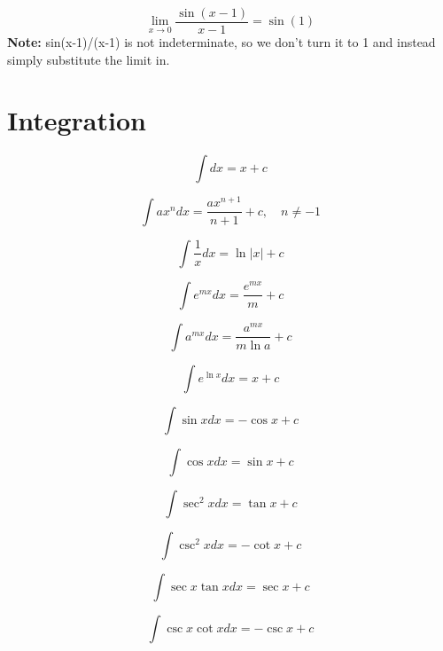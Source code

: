 \documentclass{article}
\begin{document}
\begin{equation}
\lim_{x \to 0} \frac{\sin(x-1)}{x-1} = \sin(1)
\end{equation}
\textbf{Note:} sin(x-1)/(x-1) is not indeterminate, so we don't turn it to 1 and instead simply substitute the limit in.

\section{Integration}

\begin{equation}
\int dx = x + c
\end{equation}

\begin{equation}
\int ax^n dx = \frac{a x^{n+1}}{n+1} + c, \quad n \neq -1
\end{equation}

\begin{equation}
\int \frac{1}{x} dx = \ln|x| + c
\end{equation}

\begin{equation}
\int e^{mx} dx = \frac{e^{mx}}{m} + c
\end{equation}

\begin{equation}
\int a^{mx} dx = \frac{a^{mx}}{m \ln a} + c
\end{equation}

\begin{equation}
\int e^{\ln x} dx = x + c
\end{equation}

\begin{equation}
\int \sin x dx = -\cos x + c
\end{equation}

\begin{equation}
\int \cos x dx = \sin x + c
\end{equation}

\begin{equation}
\int \sec^2 x dx = \tan x + c
\end{equation}

\begin{equation}
\int \csc^2 x dx = -\cot x + c
\end{equation}

\begin{equation}
\int \sec x \tan x dx = \sec x + c
\end{equation}

\begin{equation}
\int \csc x \cot x dx = -\csc x + c
\end{equation}
\end{document}
